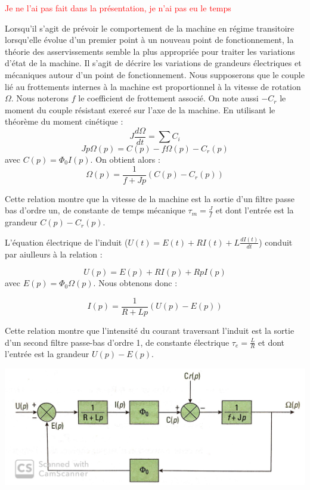 \documentclass{article}
\begin{document}
\textcolor{red}{Je ne l'ai pas fait dans la présentation, je n'ai pas eu le temps} \medskip

Lorsqu'il s'agit de prévoir le comportement de la machine en régime transitoire lorsqu'elle évolue d'un premier point à un nouveau point de fonctionnement, la théorie des asservissements semble la plus appropriée pour traiter les variations d'état de la machine. Il s'agit de décrire les variations de grandeurs électriques et mécaniques autour d'un point de fonctionnement. Nous supposerons que le couple lié au frottements internes à la machine est proportionnel à la vitesse de rotation $\Omega$. Nous noterons $f$ le coefficient de frottement associé. On note aussi $-C_r$ le moment du couple résistant exercé sur l'axe de la machine. 
\medskip
En utilisant le théorème du moment cinétique :
\begin{equation}
    J \frac{d\Omega}{dt} = \sum C_i
\end{equation}
\begin{equation}
    Jp\Omega(p) = C(p) - f\Omega(p) - C_r(p)
\end{equation}
avec $C(p) = \Phi_0 I(p)$. On obtient alors :
\begin{equation}
    \Omega (p) = \frac{1}{f + Jp}(C(p) - C_r(p) )
\end{equation}

Cette relation montre que la vitesse de la machine est la sortie d'un filtre passe bas d'ordre un, de constante de temps mécanique $\tau_m = \frac{J}{f}$ et dont l'entrée est la grandeur $C(p) - C_r (p)$.\medskip

L'équation électrique de l'induit ($U(t) = E(t) + RI(t) + L \frac{dI (t)}{dt}$) conduit par aiulleurs à la relation :

\begin{equation}
    U(p) = E(p) + RI(p) + RpI(p) 
\end{equation}
avec $E(p)=\Phi_0 \Omega(p)$. Nous obtenons donc :

\begin{equation}
    I(p) = \frac{1}{R + Lp}(U(p) - E(p))
\end{equation}

Cette relation montre que l'intensité du courant traversant l'induit est la sortie d'un second filtre passe-bas d'ordre 1, de constante électrique $\tau_e = \frac{L}{R}$ et dont l'entrée est la grandeur $U(p) - E(p)$.

\begin{center}
    \includegraphics[scale=0.18]{schemabloc2.jpg}
\end{center}
\end{document}
